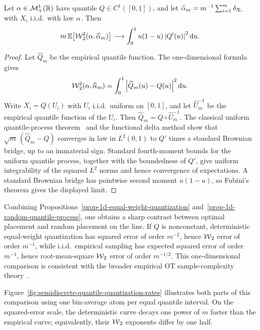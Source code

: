\begin{prop}\label{prop-1d-random-quantile-process}
	Let $\alpha\in\mathcal{M}_+^1(\mathbb{R})$ have quantile $Q\in C^1([0,1])$, and let $\widehat{\alpha}_m=m^{-1}\sum_{i=1}^m\delta_{X_i}$ with $X_i$ i.i.d.\ with law $\alpha$. Then
	\[
		m\,\mathbb{E}\!\left[\operatorname{\mathcal{W}}_2^2(\alpha,\widehat{\alpha}_m)\right]
		\longrightarrow
		\int_0^1 u(1-u)\left\lvert Q'(u)\right\rvert^2\mathrm{d} u.
	\]
\end{prop}
\begin{proof}
	Let $\widehat Q_m$ be the empirical quantile function. The one-dimensional formula gives
	\[
		\operatorname{\mathcal{W}}_2^2(\alpha,\widehat{\alpha}_m)
		=
		\int_0^1\left\lvert\widehat Q_m(u)-Q(u)\right\rvert^2\mathrm{d} u.
	\]
	Write $X_i=Q(U_i)$ with $U_i$ i.i.d.\ uniform on $[0,1]$, and let $\widehat U_m^{-1}$ be the empirical quantile function of the $U_i$. Then $\widehat Q_m=Q\circ \widehat U_m^{-1}$. The classical uniform quantile-process theorem~\cite{vanDerVaartWellner1996,BobkovLedoux2019EmpiricalKantorovich} and the functional delta method show that $\sqrt m\,(\widehat Q_m-Q)$ converges in law in $L^2(0,1)$ to $Q'$ times a standard Brownian bridge, up to an immaterial sign. Standard fourth-moment bounds for the uniform quantile process, together with the boundedness of $Q'$, give uniform integrability of the squared $L^2$ norms and hence convergence of expectations. A standard Brownian bridge has pointwise second moment $u(1-u)$, so Fubini's theorem gives the displayed limit.
\end{proof}

Combining Propositions~\ref{prop-1d-equal-weight-quantization} and~\ref{prop-1d-random-quantile-process}, one obtains a sharp contrast between optimal placement and random placement on the line. If $Q$ is nonconstant, deterministic equal-weight quantization has squared error of order $m^{-2}$, hence $\operatorname{\mathcal{W}}_2$ error of order $m^{-1}$, while i.i.d.\ empirical sampling has expected squared error of order $m^{-1}$, hence root-mean-square $\operatorname{\mathcal{W}}_2$ error of order $m^{-1/2}$. This one-dimensional comparison is consistent with the broader empirical OT sample-complexity theory~\cite{dereich2013constructive,fournier2015rate,weed2017sharp}.

Figure~\ref{fig:semidiscrete-quantile-quantization-rates} illustrates both parts of this comparison using one bin-average atom per equal quantile interval. On the squared-error scale, the deterministic curve decays one power of $m$ faster than the empirical curve; equivalently, their $\operatorname{\mathcal{W}}_2$ exponents differ by one half.

